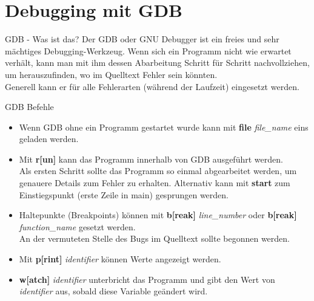 \section{Debugging mit GDB}
\begin{frame}{GDB - Was ist das?}
Der GDB oder GNU Debugger ist ein freies und sehr mächtiges Debugging-Werkzeug. Wenn sich ein Programm nicht wie erwartet verhält, kann man mit ihm dessen Abarbeitung Schritt für Schritt nachvollziehen, um herauszufinden, wo im Quelltext Fehler sein könnten. \\
\bigskip
Generell kann er für alle Fehlerarten (während der Laufzeit) eingesetzt werden. 
\end{frame}

\begin{frame}{GDB Befehle}
	\begin{itemize}
		\item Wenn GDB ohne ein Programm gestartet wurde kann mit \textbf{file}  \textit{file\_name} eins geladen werden.
		\item Mit \textbf{r[un]} kann das Programm innerhalb von GDB ausgeführt werden.\\
		Als ersten Schritt sollte das Programm so einmal abgearbeitet werden, um genauere Details zum Fehler zu erhalten. Alternativ kann mit \textbf{start} zum Einstiegspunkt (erste Zeile in main) gesprungen werden.
		\item Haltepunkte (Breakpoints) können mit \textbf{b[reak]} \textit{line\_number} oder \textbf{b[reak]} \textit{function\_name} gesetzt werden.\\
		An der vermuteten Stelle des Bugs im Quelltext sollte begonnen werden.
		\item Mit \textbf{p[rint]} \textit{identifier} können Werte angezeigt werden.
		\item \textbf{w[atch]} \textit{identifier} unterbricht das Programm und gibt den Wert von \textit{identifier} aus, sobald diese Variable geändert wird.
	\end{itemize}
\end{frame}



